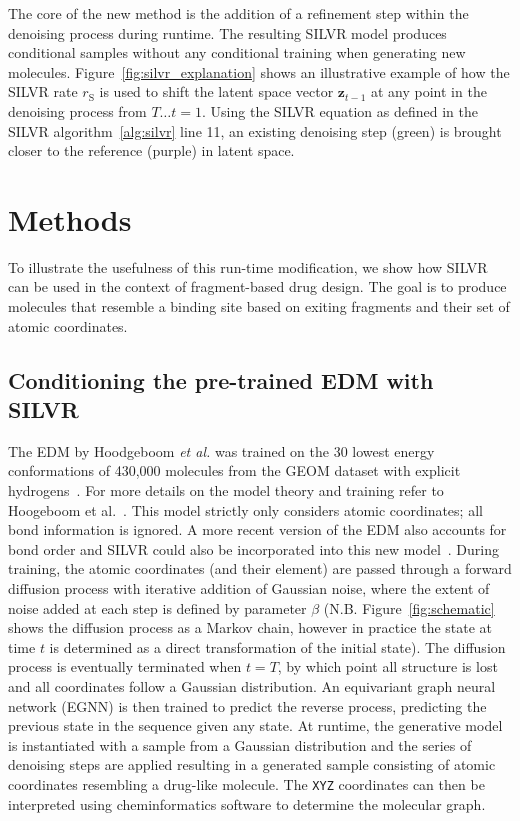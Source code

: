 \documentclass[journal=jacsat,manuscript=article]{achemso}
\begin{document}
The core of the new method is the addition of a refinement step within the denoising process during runtime. The resulting SILVR model produces conditional samples without any conditional training when generating new molecules. Figure~\ref{fig:silvr_explanation} shows an illustrative example of how the SILVR rate $r_{\mathrm{S}}$ is used to shift the latent space vector $\mathbf{z}_{t-1}$ at any point in the denoising process from $T\ldots t=1$. Using the SILVR equation as defined in the SILVR algorithm~\ref{alg:silvr} line 11, an existing denoising step (green) is brought closer to the reference (purple) in latent space. 

\section{Methods}
To illustrate the usefulness of this run-time modification, we show how SILVR can be used in the context of fragment-based drug design. The goal is to produce molecules that resemble a binding site based on exiting fragments and their set of atomic coordinates. 

\subsection{Conditioning the pre-trained EDM with SILVR}
The EDM by Hoodgeboom \textit{et al.} was trained on the 30 lowest energy conformations of 430,000 molecules from the GEOM dataset with explicit hydrogens~\cite{axelrod2022geom}. For more details on the model theory and training refer to Hoogeboom et al.~\cite{hoogeboom2022equivariant}. This model strictly only considers atomic coordinates; all bond information is ignored. A more recent version of the EDM also accounts for bond order and SILVR could also be incorporated into this new model~\cite{vignac2023midi}. During training, the atomic coordinates (and their element) are passed through a forward diffusion process with iterative addition of Gaussian noise, where the extent of noise added at each step is defined by parameter $\beta$ (N.B. Figure~\ref{fig:schematic} shows the diffusion process as a Markov chain, however in practice the state at time $t$ is determined as a direct transformation of the initial state). The diffusion process is eventually terminated when $t=T$, by which point all structure is lost and all coordinates follow a Gaussian distribution. An equivariant graph neural network (EGNN) is then trained to predict the reverse process, predicting the previous state in the sequence given any state. At runtime, the generative model is instantiated with a sample from a Gaussian distribution and the series of denoising steps are applied resulting in a generated sample consisting of atomic coordinates resembling a drug-like molecule. The \texttt{XYZ} coordinates can then be interpreted using cheminformatics software to determine the molecular graph. 
\end{document}
